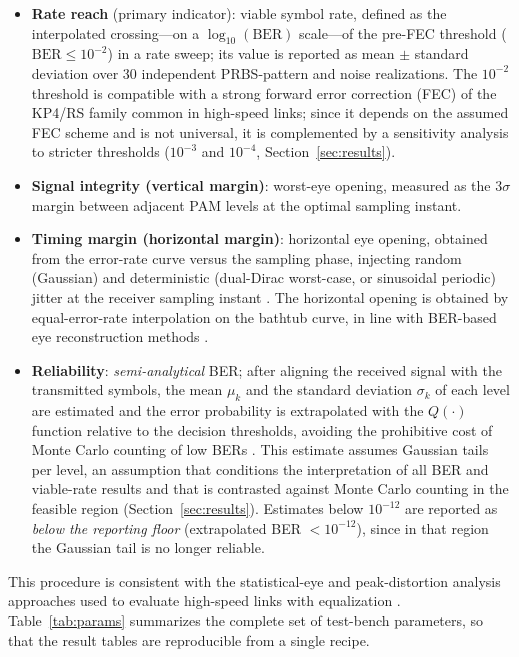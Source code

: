 \documentclass{ieeeaccess}
\begin{document}
\begin{itemize}
\item \textbf{Rate reach} (primary indicator): viable symbol rate, defined
as the interpolated crossing---on a $\log_{10}(\mathrm{BER})$ scale---of the
pre-FEC threshold ($\mathrm{BER}\le 10^{-2}$) in a rate sweep; its value is
reported as mean $\pm$ standard deviation over 30 independent PRBS-pattern
and noise realizations. The $10^{-2}$ threshold is compatible with a strong
forward error correction (FEC) of the KP4/RS family common in high-speed
links; since it depends on the assumed FEC scheme and is not universal, it
is complemented by a sensitivity analysis to stricter thresholds ($10^{-3}$
and $10^{-4}$, Section~\ref{sec:results}).
\item \textbf{Signal integrity (vertical margin)}: worst-eye opening,
measured as the $3\sigma$ margin between adjacent PAM levels at the optimal
sampling instant.
\item \textbf{Timing margin (horizontal margin)}: horizontal eye opening,
obtained from the error-rate curve versus the sampling phase, injecting
random (Gaussian) and deterministic (dual-Dirac worst-case, or sinusoidal
periodic) jitter at the receiver sampling instant \cite{805809,9874925}. The
horizontal opening is obtained by equal-error-rate interpolation on the
bathtub curve, in line with BER-based eye reconstruction methods
\cite{Chen2024BER}.
\item \textbf{Reliability}: \emph{semi-analytical} BER; after aligning the
received signal with the transmitted symbols, the mean $\mu_k$ and the
standard deviation $\sigma_k$ of each level are estimated and the error
probability is extrapolated with the $Q(\cdot)$ function relative to the
decision thresholds, avoiding the prohibitive cost of Monte Carlo counting
of low BERs \cite{6248821,7202856,10415105}. This estimate assumes Gaussian
tails per level, an assumption that conditions the interpretation of all BER
and viable-rate results and that is contrasted against Monte Carlo counting
in the feasible region (Section~\ref{sec:results}). Estimates below
$10^{-12}$ are reported as \emph{below the reporting floor} (extrapolated
BER $<10^{-12}$), since in that region the Gaussian tail is no longer
reliable.
\end{itemize}

This procedure is consistent with the statistical-eye and peak-distortion
analysis approaches used to evaluate high-speed links with equalization
\cite{10705630}. Table~\ref{tab:params} summarizes the complete set of
test-bench parameters, so that the result tables are reproducible from a
single recipe.
\end{document}

